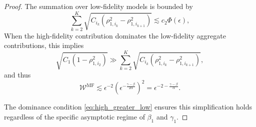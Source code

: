 \begin{proof}
%
The summation over low-fidelity models is bounded by
\[
\sum_{k=2}^{K} \sqrt{C_{i_k} \left(\rho_{1,i_k}^2 - \rho_{1,i_{k+1}}^2\right)} \lesssim c_2 \Phi(\epsilon),
\]
When the high-fidelity contribution dominates the low-fidelity aggregate contributions, this implies
%
\begin{equation}\label{eq:high_greater_low}
    \sqrt{C_1 \left(1 - \rho_{1,i_2}^2\right)} \gg \sum_{k=2}^{K} \sqrt{C_{i_k} \left(\rho_{1,i_k}^2 - \rho_{1,i_{k+1}}^2\right)},
\end{equation}
%
and thus
%
\begin{equation*}
    \mathcal{W}^{\mathrm{MF}} \lesssim \epsilon^{-2} \left( \epsilon^{-\frac{\gamma-\beta}{2\alpha}} \right)^2 = \epsilon^{-2 - \frac{\gamma-\beta}{\alpha}}.
\end{equation*}
%

The dominance condition \eqref{eq:high_greater_low} ensures this simplification holds regardless of the specific asymptotic regime of $\beta_1$ and $\gamma_1$.

\end{proof}










